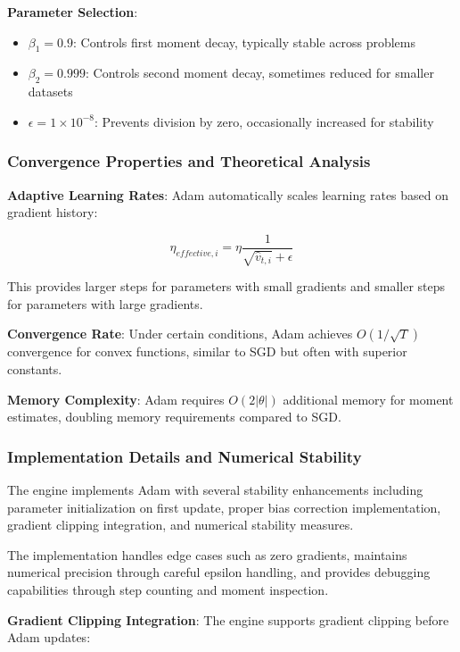 \documentclass[11pt,a4paper]{report}
\begin{document}
\textbf{Parameter Selection}:
\begin{itemize}
\item $\beta_1 = 0.9$: Controls first moment decay, typically stable across problems
\item $\beta_2 = 0.999$: Controls second moment decay, sometimes reduced for smaller datasets
\item $\epsilon = 1 \times 10^{-8}$: Prevents division by zero, occasionally increased for stability
\end{itemize}

\subsubsection{Convergence Properties and Theoretical Analysis}

\textbf{Adaptive Learning Rates}: Adam automatically scales learning rates based on gradient history:

\begin{equation}
\eta_{effective,i} = \eta \frac{1}{\sqrt{\hat{v}_{t,i}} + \epsilon}
\end{equation}

This provides larger steps for parameters with small gradients and smaller steps for parameters with large gradients.

\textbf{Convergence Rate}: Under certain conditions, Adam achieves $O(1/\sqrt{T})$ convergence for convex functions, similar to SGD but often with superior constants.

\textbf{Memory Complexity}: Adam requires $O(2|\theta|)$ additional memory for moment estimates, doubling memory requirements compared to SGD.

\subsubsection{Implementation Details and Numerical Stability}

The engine implements Adam with several stability enhancements including parameter initialization on first update, proper bias correction implementation, gradient clipping integration, and numerical stability measures.

The implementation handles edge cases such as zero gradients, maintains numerical precision through careful epsilon handling, and provides debugging capabilities through step counting and moment inspection.

\textbf{Gradient Clipping Integration}: The engine supports gradient clipping before Adam updates:
\end{document}
